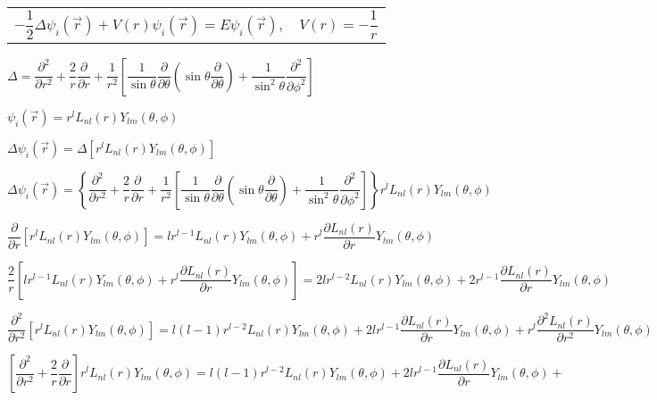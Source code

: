 \documentclass{jarticle}%
\begin{document}
%
\begin{tabular}
[c]{ll}%
$-\dfrac{1}{2}\Delta\psi_{i}\left(  \vec{r}\right)  +V\left(  r\right)
\psi_{i}\left(  \vec{r}\right)  =E\psi_{i}\left(  \vec{r}\right)  ,$ &
$V\left(  r\right)  =-\dfrac{1}{r}$%
\end{tabular}


$\Delta=\dfrac{\partial^{2}}{\partial r^{2}}+\dfrac{2}{r}\dfrac{\partial
}{\partial r}+\dfrac{1}{r^{2}}\left[  \dfrac{1}{\sin\theta}\dfrac{\partial
}{\partial\theta}\left(  \sin\theta\dfrac{\partial}{\partial\theta}\right)
+\dfrac{1}{\sin^{2}\theta}\dfrac{\partial^{2}}{\partial\phi^{2}}\right]  $

$\psi_{i}\left(  \vec{r}\right)  =r^{l}L_{nl}\left(  r\right)  Y_{lm}\left(
\theta,\phi\right)  $

$\Delta\psi_{i}\left(  \vec{r}\right)  =\Delta\left[  r^{l}L_{nl}\left(
r\right)  Y_{lm}\left(  \theta,\phi\right)  \right]  $

$\Delta\psi_{i}\left(  \vec{r}\right)  =\left\{  \dfrac{\partial^{2}}{\partial
r^{2}}+\dfrac{2}{r}\dfrac{\partial}{\partial r}+\dfrac{1}{r^{2}}\left[
\dfrac{1}{\sin\theta}\dfrac{\partial}{\partial\theta}\left(  \sin\theta
\dfrac{\partial}{\partial\theta}\right)  +\dfrac{1}{\sin^{2}\theta}%
\dfrac{\partial^{2}}{\partial\phi^{2}}\right]  \right\}  r^{l}L_{nl}\left(
r\right)  Y_{lm}\left(  \theta,\phi\right)  $

$\dfrac{\partial}{\partial r}\left[  r^{l}L_{nl}\left(  r\right)
Y_{lm}\left(  \theta,\phi\right)  \right]  =lr^{l-1}L_{nl}\left(  r\right)
Y_{lm}\left(  \theta,\phi\right)  +r^{l}\dfrac{\partial L_{nl}\left(
r\right)  }{\partial r}Y_{lm}\left(  \theta,\phi\right)  $

$\dfrac{2}{r}\left[  lr^{l-1}L_{nl}\left(  r\right)  Y_{lm}\left(  \theta
,\phi\right)  +r^{l}\dfrac{\partial L_{nl}\left(  r\right)  }{\partial
r}Y_{lm}\left(  \theta,\phi\right)  \right]  =2lr^{l-2}L_{nl}\left(  r\right)
Y_{lm}\left(  \theta,\phi\right)  +2r^{l-1}\dfrac{\partial L_{nl}\left(
r\right)  }{\partial r}Y_{lm}\left(  \theta,\phi\right)  $

$\dfrac{\partial^{2}}{\partial r^{2}}\left[  r^{l}L_{nl}\left(  r\right)
Y_{lm}\left(  \theta,\phi\right)  \right]  =l\left(  l-1\right)  r^{l-2}%
L_{nl}\left(  r\right)  Y_{lm}\left(  \theta,\phi\right)  +2lr^{l-1}%
\dfrac{\partial L_{nl}\left(  r\right)  }{\partial r}Y_{lm}\left(  \theta
,\phi\right)  +r^{l}\dfrac{\partial^{2}L_{nl}\left(  r\right)  }{\partial
r^{2}}Y_{lm}\left(  \theta,\phi\right)  $

$\left[  \dfrac{\partial^{2}}{\partial r^{2}}+\dfrac{2}{r}\dfrac{\partial
}{\partial r}\right]  r^{l}L_{nl}\left(  r\right)  Y_{lm}\left(  \theta
,\phi\right)  =l\left(  l-1\right)  r^{l-2}L_{nl}\left(  r\right)
Y_{lm}\left(  \theta,\phi\right)  +2lr^{l-1}\dfrac{\partial L_{nl}\left(
r\right)  }{\partial r}Y_{lm}\left(  \theta,\phi\right)  +$
\end{document}
